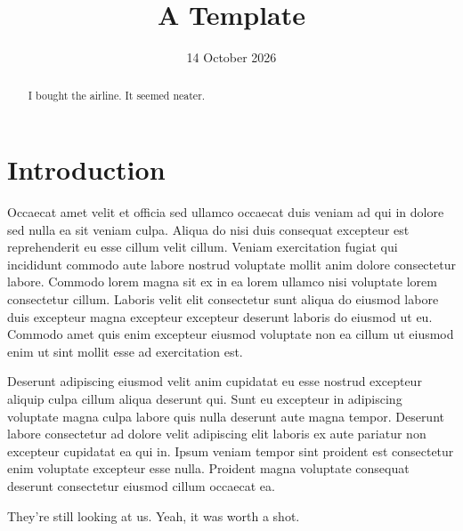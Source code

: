 \documentclass{article}
\title{A Template}
\affiliation{cobol}{Cobol Institute of Engineering\\Mombasa, IC, USA}
\affiliation{inc}{Inception University}
\date{14 October 2026}
\begin{document}
\maketitle

\begin{abstract}
  I bought the airline. It seemed neater.
\end{abstract}

\section{Introduction}

Occaecat amet velit et officia sed ullamco occaecat duis veniam ad qui in dolore sed nulla ea sit veniam culpa. Aliqua do nisi duis consequat excepteur est reprehenderit eu esse cillum velit cillum. Veniam exercitation fugiat qui incididunt commodo aute labore nostrud voluptate mollit anim dolore consectetur labore. Commodo lorem magna sit ex in ea lorem ullamco nisi voluptate lorem consectetur cillum. Laboris velit elit consectetur sunt aliqua do eiusmod labore duis excepteur magna excepteur excepteur deserunt laboris do eiusmod ut eu. Commodo amet quis enim excepteur eiusmod voluptate non ea cillum ut eiusmod enim ut sint mollit esse ad exercitation est.

Deserunt adipiscing eiusmod velit anim cupidatat eu esse nostrud excepteur aliquip culpa cillum aliqua deserunt qui. Sunt eu excepteur in adipiscing voluptate magna culpa labore quis nulla deserunt aute magna tempor. Deserunt labore consectetur ad dolore velit adipiscing elit laboris ex aute pariatur non excepteur cupidatat ea qui in. Ipsum veniam tempor sint proident est consectetur enim voluptate excepteur esse nulla. Proident magna voluptate consequat deserunt consectetur eiusmod cillum occaecat ea.

\begin{ack}
  They're still looking at us. Yeah, it was worth a shot.
\end{ack}
\end{document}

